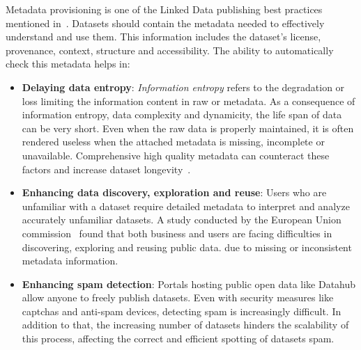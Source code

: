 Metadata provisioning is one of the Linked Data publishing best practices mentioned in~\cite{Bizer:DB:11}. Datasets should contain the metadata needed to effectively understand and use them. This information includes the dataset's license, provenance, context, structure and accessibility. The ability to automatically check this metadata helps in:
\begin{itemize}
  \item \textbf{Delaying data entropy}: \textit{Information entropy} refers to the degradation or loss limiting the information content in raw or metadata. As a consequence of information entropy, data complexity and dynamicity, the life span of data can be very short. Even when the raw data is properly maintained, it is often rendered useless when the attached metadata is missing, incomplete or unavailable. Comprehensive high quality metadata can counteract these factors and increase dataset longevity~\cite{Kovacs:GTOS:00}.
  \item \textbf{Enhancing data discovery, exploration and reuse}: Users who are unfamiliar with a dataset require detailed metadata to interpret and analyze accurately unfamiliar datasets. A study conducted by the European Union commission~\cite{Graham:TechReport:11} found that both business and users are facing difficulties in discovering, exploring and reusing public data. due to missing or inconsistent metadata information.
  \item \textbf{Enhancing spam detection}: Portals hosting public open data like Datahub allow anyone to freely publish datasets. Even with security measures like captchas and anti-spam devices, detecting spam is increasingly difficult. In addition to that, the increasing number of datasets hinders the scalability of this process, affecting the correct and efficient spotting of datasets spam.
\end{itemize}


